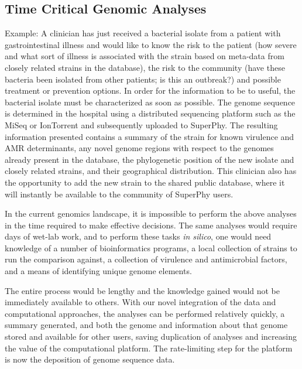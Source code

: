 \documentclass[a4paper,twoside]{article}
\begin{document}
\subsection{Time Critical Genomic Analyses}
Example: A clinician has just received a bacterial isolate from a patient with gastrointestinal illness and would like to know the risk to the patient (how severe and what sort of illness is associated with the strain based on meta-data from closely related strains in the database), the risk to the community (have these bacteria been isolated from other patients; is this an outbreak?) and possible treatment or prevention options. In order for the information to be to useful, the bacterial isolate must be characterized as soon as possible. The genome sequence is determined in the hospital using a distributed sequencing platform such as the MiSeq or IonTorrent and subsequently uploaded to SuperPhy. The resulting information presented contains a summary of the strain for known virulence and AMR determinants, any novel genome regions with respect to the genomes already present in the database, the phylogenetic position of the new isolate and closely related strains, and their geographical distribution. This clinician also has the opportunity to add the new strain to the shared public database, where it will instantly be available to the community of SuperPhy users.

In the current genomics landscape, it is impossible to perform the above analyses in the time required to make effective decisions. The same analyses would require days of wet-lab work, and to perform these tasks \textit{in silico}, one would need knowledge of a number of bioinformatics programs, a local collection of strains to run the comparison against, a collection of virulence and antimicrobial factors, and a means of identifying unique genome elements.

The entire process would be lengthy and the knowledge gained would not be immediately available to others. With our novel integration of the data and computational approaches, the analyses can be performed relatively quickly, a summary generated, and both the genome and
information about that genome stored and available for other users, saving duplication of analyses and increasing the value of the computational platform. The rate-limiting step for the platform is now the deposition of genome sequence data.
\end{document}

